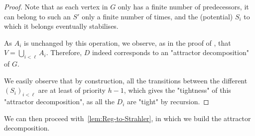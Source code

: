 \documentclass[a4paper,UKenglish,cleveref, autoref, thm-restate]{lipics-v2021}
\begin{document}
\begin{proof}
	Note that as each vertex in $G$ only has a finite number of predecessors, it can belong to such an $S'$ only a finite number of times, and the (potential) $S_i$ to which it belongs eventually stabilises.
	
	As $A_{i}$ is unchanged by this operation, we observe, as in the proof of , that $V=\bigcup_{i< \ell}A_i$.
	Therefore, $D$ indeed corresponds to an "attractor decomposition" of $G$.
	
	We easily observe that by construction, all the transitions between the different $(S_i)_{i < \ell}$ are at least of priority $h-1$, which gives the "tightness" of this "attractor decomposition", as all the $D_i$ are "tight" by recursion.
\end{proof}

We can then proceed with~\cref{lem:Reg-to-Strahler}, in which we build the attractor decomposition.

\propRegToStrahler*
\end{document}
